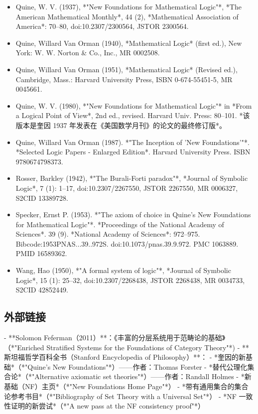 \begin{itemize}
\item Quine, W. V. (1937), *"New Foundations for Mathematical Logic"*, *The American Mathematical Monthly*, 44 (2), *Mathematical Association of America*: 70–80, doi:10.2307/2300564, JSTOR 2300564.  
\item Quine, Willard Van Orman (1940), *Mathematical Logic* (first ed.), New York: W. W. Norton & Co., Inc., MR 0002508.  
\item Quine, Willard Van Orman (1951), *Mathematical Logic* (Revised ed.), Cambridge, Mass.: Harvard University Press, ISBN 0-674-55451-5, MR 0045661.  
\item Quine, W. V. (1980), *"New Foundations for Mathematical Logic"* in *From a Logical Point of View*, 2nd ed., revised. Harvard Univ. Press: 80–101. *该版本是奎因 1937 年发表在《美国数学月刊》的论文的最终修订版*。  
\item Quine, Willard Van Orman (1987). *"The Inception of 'New Foundations'"*. *Selected Logic Papers - Enlarged Edition*. Harvard University Press. ISBN 9780674798373.  
\item Rosser, Barkley (1942), *"The Burali-Forti paradox"*, *Journal of Symbolic Logic*, 7 (1): 1–17, doi:10.2307/2267550, JSTOR 2267550, MR 0006327, S2CID 13389728.  
\item Specker, Ernst P. (1953). *"The axiom of choice in Quine's New Foundations for Mathematical Logic"*. *Proceedings of the National Academy of Sciences*. 39 (9). *National Academy of Sciences*: 972–975. Bibcode:1953PNAS...39..972S. doi:10.1073/pnas.39.9.972. PMC 1063889. PMID 16589362.  
\item Wang, Hao (1950), *"A formal system of logic"*, *Journal of Symbolic Logic*, 15 (1): 25–32, doi:10.2307/2268438, JSTOR 2268438, MR 0034733, S2CID 42852449.
\end{itemize}
\subsection{外部链接}  

- **Solomon Feferman（2011）**：《丰富的分层系统用于范畴论的基础》（*"Enriched Stratified Systems for the Foundations of Category Theory"*)  
- **斯坦福哲学百科全书（Stanford Encyclopedia of Philosophy）**：  
  - *奎因的新基础*（*"Quine's New Foundations"*）——作者：Thomas Forster  
  - *替代公理化集合论*（*"Alternative axiomatic set theories"*）——作者：Randall Holmes    
  - *新基础（NF）主页*（*"New Foundations Home Page"*）  
  - *带有通用集合的集合论参考书目*（*"Bibliography of Set Theory with a Universal Set"*）  
  - *NF 一致性证明的新尝试*（*"A new pass at the NF consistency proof"*）  